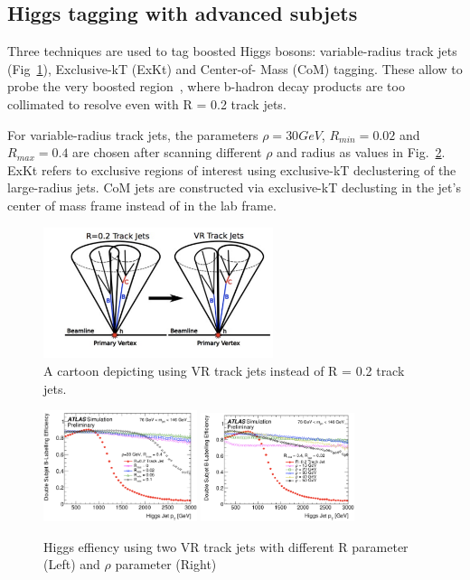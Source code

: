 \subsection{Higgs tagging with advanced subjets}

\par Three techniques are used to tag boosted Higgs bosons: variable-radius track jets (Fig~\ref{fig:vr}), Exclusive-kT (ExKt) and Center-of- Mass (CoM) tagging. These allow to probe the very boosted region~\cite{ATL-PHYS-PUB-2017-010}, where b-hadron decay products are too collimated to resolve even with R = 0.2 track jets.
\par For variable-radius track jets, the parameters $\rho = 30 GeV$, $R_{min} = 0.02$ and $R_{max} = 0.4$ 
are chosen after scanning different $\rho$ and radius as values in Fig.~\ref{fig:vr-scan}. ExKt refers to exclusive regions of interest using exclusive-kT declustering of the large-radius jets. 
CoM jets are constructed via exclusive-kT declusting in the jet's center of mass frame instead of in the lab frame.

\begin{figure}[htbp]
    \centering
    \includegraphics[width=0.6\textwidth]{chapters/c5/figures/VR}
    \caption{A cartoon depicting using VR track jets instead of R = 0.2 track jets.}
    \label{fig:vr}
\end{figure}

\begin{figure}[htbp]
    \centering
    \includegraphics[width=0.4\textwidth]{chapters/c5/figures/r-vr}
    \includegraphics[width=0.4\textwidth]{chapters/c5/figures/rho-vr}
    \caption{Higgs effiency using two VR track jets with different R parameter (Left) and $\rho$ parameter (Right)} 
    \label{fig:vr-scan}
\end{figure}

